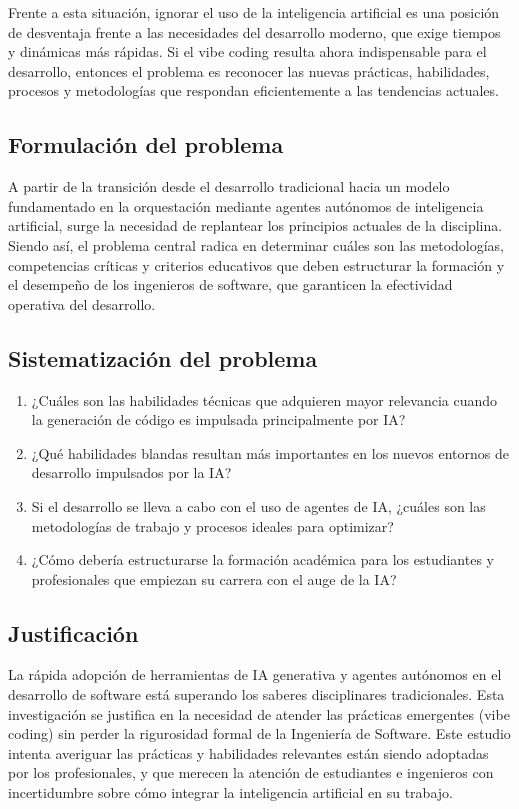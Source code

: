 \documentclass[12pt, letterpaper]{article}
\begin{document}
Frente a esta situación, ignorar el uso de la inteligencia artificial es una posición de desventaja frente a las necesidades del desarrollo moderno, que exige tiempos y dinámicas más rápidas. Si el vibe coding resulta ahora indispensable para el desarrollo, entonces el problema es reconocer las nuevas prácticas, habilidades, procesos y metodologías que respondan eficientemente a las tendencias actuales.

\subsection{Formulación del problema}

A partir de la transición desde el desarrollo tradicional hacia un modelo fundamentado en la orquestación mediante agentes autónomos de inteligencia artificial, surge la necesidad de replantear los principios actuales de la disciplina. Siendo así, el problema central radica en determinar cuáles son las metodologías, competencias críticas y criterios educativos que deben estructurar la formación y el desempeño de los ingenieros de software, que garanticen la efectividad operativa del desarrollo.

\subsection{Sistematización del problema}

\begin{enumerate}
    \item ¿Cuáles son las habilidades técnicas que adquieren mayor relevancia cuando la generación de código es impulsada principalmente por IA?
    \item ¿Qué habilidades blandas resultan más importantes en los nuevos entornos de desarrollo impulsados por la IA?
    \item Si el desarrollo se lleva a cabo con el uso de agentes de IA, ¿cuáles son las metodologías de trabajo y procesos ideales para optimizar?
    \item ¿Cómo debería estructurarse la formación académica para los estudiantes y profesionales que empiezan su carrera con el auge de la IA?
\end{enumerate}

\subsection{Justificación}

La rápida adopción de herramientas de IA generativa y agentes autónomos en el desarrollo de software está superando los saberes disciplinares tradicionales. Esta investigación se justifica en la necesidad de atender las prácticas emergentes (vibe coding) sin perder la rigurosidad formal de la Ingeniería de Software. Este estudio intenta averiguar las prácticas y habilidades relevantes están siendo adoptadas por los profesionales, y que merecen la atención de estudiantes e ingenieros con incertidumbre sobre cómo integrar la inteligencia artificial en su trabajo.
\end{document}
